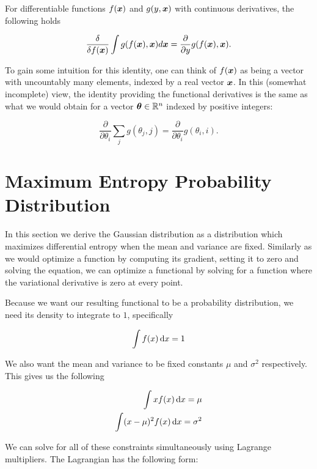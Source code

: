 For differentiable functions $f({\bm{x}})$ and $g(y, {\bm{x}})$ with continuous derivatives, the following holds

\begin{equation}
\frac{\delta}{\delta f({\bm{x}})} \int g(f({\bm{x}}), {\bm{x}}) d {\bm{x}} = \frac{\partial}{\partial y} g(f({\bm{x}}), {\bm{x}}).
\end{equation}

 To gain some intuition for this identity, one can think of $f({\bm{x}})$ as being a vector with uncountably many elements, indexed by a real vector ${\bm{x}}$. In this (somewhat incomplete) view, the identity providing the functional derivatives is the same as what we would obtain for a vector ${\bm{\theta}} \in {\mathbb{R}}^n$ indexed by positive integers:

\begin{equation}
\frac{\partial}{\partial \theta_i} \sum_j g(\theta_j, j) = \frac{\partial}{\partial \theta_i} g(\theta_i, i).
\end{equation}

\section{Maximum Entropy Probability Distribution}

In this section we derive the Gaussian distribution as a distribution which maximizes differential entropy when the mean and variance are fixed. Similarly as we would optimize a function by computing its gradient, setting it to zero and solving the equation, we can optimize a functional by solving for a function where the variational derivative is zero at every point.

Because we want our resulting functional to be a probability distribution, we need its density to integrate to $1$, specifically

\begin{equation}
\int f(x) \mathop{}\!\mathrm{d} x = 1
\end{equation}

We also want the mean and variance to be fixed constants $\mu$ and $\sigma^2$ respectively. This gives us the following

\begin{align}
\int x f(x) \mathop{}\!\mathrm{d} x = \mu \\
\int (x - \mu) ^2 f(x) \mathop{}\!\mathrm{d} x = \sigma^2
\end{align}

We can solve for all of these constraints simultaneously using Lagrange multipliers. The Lagrangian has the following form:

